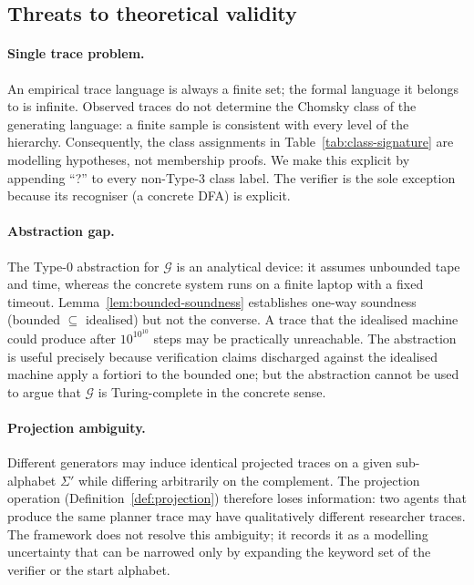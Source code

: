 \subsection{Threats to theoretical validity}

\paragraph{Single trace problem.}
An empirical trace language is always a finite set; the formal
language it belongs to is infinite.  Observed traces do not
determine the Chomsky class of the generating language: a finite
sample is consistent with every level of the hierarchy.
Consequently, the class assignments in
Table~\ref{tab:class-signature} are modelling hypotheses, not
membership proofs.  We make this explicit by appending ``?'' to
every non-Type-3 class label.  The verifier is the sole exception
because its recogniser (a concrete DFA) is explicit.

\paragraph{Abstraction gap.}
The Type-0 abstraction for $\mathcal{G}$ is an analytical device:
it assumes unbounded tape and time, whereas the concrete system
runs on a finite laptop with a fixed timeout.  Lemma~\ref{lem:bounded-soundness}
establishes one-way soundness (bounded $\subseteq$ idealised) but
not the converse.  A trace that the idealised machine could produce
after $10^{10^{10}}$ steps may be practically unreachable.
The abstraction is useful precisely because verification claims
discharged against the idealised machine apply a fortiori to the
bounded one; but the abstraction cannot be used to argue that
$\mathcal{G}$ is Turing-complete in the concrete sense.

\paragraph{Projection ambiguity.}
Different generators may induce identical projected traces on a
given sub-alphabet $\Sigma'$ while differing arbitrarily on the
complement.  The projection operation
(Definition~\ref{def:projection}) therefore loses information:
two agents that produce the same planner trace may have
qualitatively different researcher traces.  The framework does not
resolve this ambiguity; it records it as a modelling uncertainty
that can be narrowed only by expanding the keyword set of the
verifier or the start alphabet.

